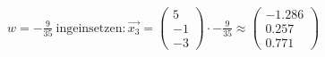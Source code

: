 \documentclass[preview]{standalone}
\begin{document}
\begin{center}
$w = -\frac{9}{35} \: \mathrm{in g einsetzen:} \vec{x_3} = \begin{pmatrix} 5 \\ -1 \\ -3 \end{pmatrix} \cdot -\frac{9}{35} \approx \begin{pmatrix} -1.286 \\ 0.257 \\ 0.771 \end{pmatrix}$
\end{center}
\end{document}
